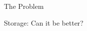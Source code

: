 \begin{frame}{The Problem}
\begin{center}
   \Huge Storage: Can it be better?
\end{center}
\end{frame}